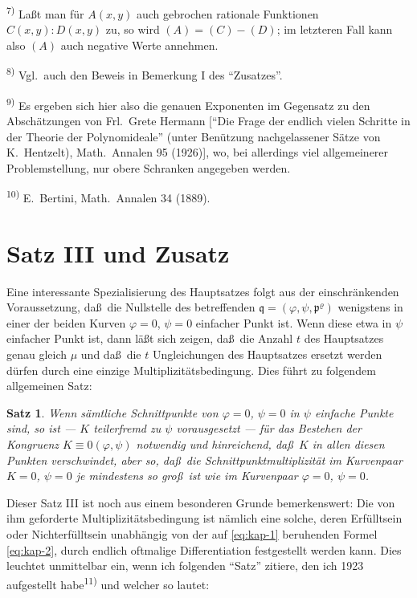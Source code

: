 \documentclass[12pt,a4paper]{article}
\theoremstyle{plain}
\newtheorem{satz}{Satz}[section]
\theoremstyle{definition}
\theoremstyle{remark}
\begin{document}
{\footnotesize
\textsuperscript{7)} La\ss t man f\"ur $A(x,y)$ auch gebrochen rationale Funktionen $C(x,y):D(x,y)$
zu, so wird $(A) = (C) - (D)$; im letzteren Fall kann also $(A)$ auch negative
Werte annehmen.

\textsuperscript{8)} Vgl.\ auch den Beweis in Bemerkung I des ``Zusatzes''.

\textsuperscript{9)} Es ergeben sich hier also die genauen Exponenten im Gegensatz zu den
Absch\"atzungen von Frl.\ Grete Hermann [``Die Frage der endlich vielen Schritte
in der Theorie der Polynomideale'' (unter Ben\"utzung nachgelassener S\"atze von
K.\ Hentzelt), Math.\ Annalen 95 (1926)], wo, bei allerdings viel allgemeinerer
Problemstellung, nur obere Schranken angegeben werden.

\textsuperscript{10)} E.\ Bertini, Math.\ Annalen 34 (1889).
}

\newpage
\section*{Satz III und Zusatz}

Eine interessante Spezialisierung des Hauptsatzes folgt aus der
einschr\"ankenden Voraussetzung, da\ss\ die Nullstelle des betreffenden
$\mathfrak{q} = (\varphi, \psi, \mathfrak{p}^{\varrho})$ wenigstens in einer der beiden
Kurven $\varphi = 0$, $\psi = 0$ einfacher Punkt ist. Wenn diese etwa in
$\psi$ einfacher Punkt ist, dann l\"a\ss t sich zeigen, da\ss\ die Anzahl $t$
des Hauptsatzes genau gleich $\mu$ und da\ss\ die $t$ Ungleichungen des
Hauptsatzes ersetzt werden d\"urfen durch eine einzige
Multiplizit\"atsbedingung. Dies f\"uhrt zu folgendem allgemeinen Satz:

\begin{satz}\label{satz:kap-III}
Wenn s\"amtliche Schnittpunkte von $\varphi = 0$, $\psi = 0$ in $\psi$
einfache Punkte sind, so ist --- $K$ teilerfremd zu $\psi$ vorausgesetzt
--- f\"ur das Bestehen der Kongruenz $K \equiv 0(\varphi, \psi)$ notwendig
und hinreichend, da\ss\ $K$ in allen diesen Punkten verschwindet,
aber so, da\ss\ die Schnittpunktmultiplizit\"at im Kurvenpaar
$K = 0$, $\psi = 0$ je mindestens so gro\ss\ ist wie im Kurvenpaar
$\varphi = 0$, $\psi = 0$.
\end{satz}

Dieser Satz III ist noch aus einem besonderen Grunde bemerkenswert:
Die von ihm geforderte Multiplizit\"atsbedingung ist n\"amlich eine
solche, deren Erf\"ulltsein oder Nichterf\"ulltsein unabh\"angig von der
auf \eqref{eq:kap-1} beruhenden Formel \eqref{eq:kap-2}, durch endlich
oftmalige Differentiation festgestellt werden kann. Dies leuchtet
unmittelbar ein, wenn ich folgenden ``Satz'' zitiere, den ich 1923
aufgestellt habe\textsuperscript{11)} und welcher so lautet:
\end{document}
